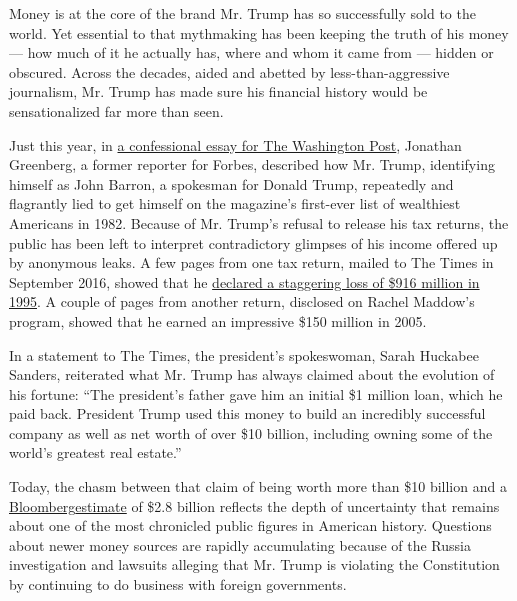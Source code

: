 Money is at the core of the brand Mr. Trump has so successfully sold to
the world. Yet essential to that mythmaking has been keeping the truth
of his money --- how much of it he actually has, where and whom it came
from --- hidden or obscured. Across the decades, aided and abetted by
less-than-aggressive journalism, Mr. Trump has made sure his financial
history would be sensationalized far more than seen.

Just this year, in
\href{https://www.washingtonpost.com/outlook/trump-lied-to-me-about-his-wealth-to-get-onto-the-forbes-400-here-are-the-tapes/2018/04/20/ac762b08-4287-11e8-8569-26fda6b404c7_story.html?utm_term=.58b3e74458b5}{a
confessional essay for The Washington Post}, Jonathan Greenberg, a
former reporter for Forbes, described how Mr. Trump, identifying himself
as John Barron, a spokesman for Donald Trump, repeatedly and flagrantly
lied to get himself on the magazine's first-ever list of wealthiest
Americans in 1982. Because of Mr. Trump's refusal to release his tax
returns, the public has been left to interpret contradictory glimpses of
his income offered up by anonymous leaks. A few pages from one tax
return, mailed to The Times in September 2016, showed that he
\href{https://www.nytimes3xbfgragh.onion/2016/10/02/us/politics/donald-trump-taxes.html}{declared
a staggering loss of \$916 million in 1995}. A couple of pages from
another return, disclosed on Rachel Maddow's program, showed that he
earned an impressive \$150 million in 2005.

In a statement to The Times, the president's spokeswoman, Sarah Huckabee
Sanders, reiterated what Mr. Trump has always claimed about the
evolution of his fortune: ``The president's father gave him an initial
\$1 million loan, which he paid back. President Trump used this money to
build an incredibly successful company as well as net worth of over \$10
billion, including owning some of the world's greatest real estate.''

Today, the chasm between that claim of being worth more than \$10
billion and a
\href{https://www.bloomberg.com/news/articles/2018-05-31/trump-s-net-worth-slides-to-2-8-billion-lowest-since-campaign}{Bloomberg}\href{https://www.bloomberg.com/news/articles/2018-05-31/trump-s-net-worth-slides-to-2-8-billion-lowest-since-campaign}{estimate}
of \$2.8 billion reflects the depth of uncertainty that remains about
one of the most chronicled public figures in American history. Questions
about newer money sources are rapidly accumulating because of the Russia
investigation and lawsuits alleging that Mr. Trump is violating the
Constitution by continuing to do business with foreign governments.

